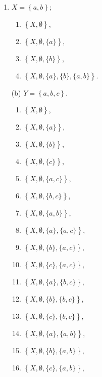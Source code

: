 \documentclass[a4paper, 12pt]{config/homework}
\begin{document}
\begin{enumerate}
\begin{minipage}[t]{0.45\textwidth}
\begin{enumerate}[label=(\alph*)]
\item \(X = \left\{a,b\right\}\);
\begin{enumerate}[label=\roman*.]
\item \(\left\{X, \emptyset\right\}\),
\item \(\left\{X,\emptyset, \{a\} \right\}\),
\item \(\left\{X,\emptyset, \{b\} \right\}\),
\item \(\left\{X,\emptyset, \{a\}, \{b\}, \{a,b\} \right\}\).
\end{enumerate}
\end{enumerate}
\end{minipage}
\hfill
\begin{minipage}[t]{0.54\textwidth}
\begin{enumerate}
\item[(b)] \(Y = \left\{a,b,c\right\}\).
\begin{enumerate}[label=\roman*.]
\item \(\left\{X,\emptyset \right\}\),
\item \(\left\{X,\emptyset, \{a\} \right\}\),
\item \(\left\{X,\emptyset, \{b\} \right\}\),
\item \(\left\{X,\emptyset, \{c\} \right\}\),
\item \(\left\{X,\emptyset, \{a,c\} \right\}\),
\item \(\left\{X,\emptyset, \{b,c\} \right\}\),
\item \(\left\{X,\emptyset, \{a,b\} \right\}\),
\item \(\left\{X,\emptyset, \{a\}, \{a,c\} \right\}\),
\item \(\left\{X,\emptyset, \{b\}, \{a,c\} \right\}\),
\item \(\left\{X,\emptyset, \{c\}, \{a,c\} \right\}\),
\item \(\left\{X,\emptyset, \{a\}, \{b,c\} \right\}\),
\item \(\left\{X,\emptyset, \{b\}, \{b,c\} \right\}\),
\item \(\left\{X,\emptyset, \{c\}, \{b,c\} \right\}\),
\item \(\left\{X,\emptyset, \{a\}, \{a,b\} \right\}\),
\item \(\left\{X,\emptyset, \{b\}, \{a,b\} \right\}\),
\item \(\left\{X,\emptyset, \{c\}, \{a,b\} \right\}\),

\end{enumerate}
\end{enumerate}
\end{minipage}
\end{enumerate}
\end{document}
